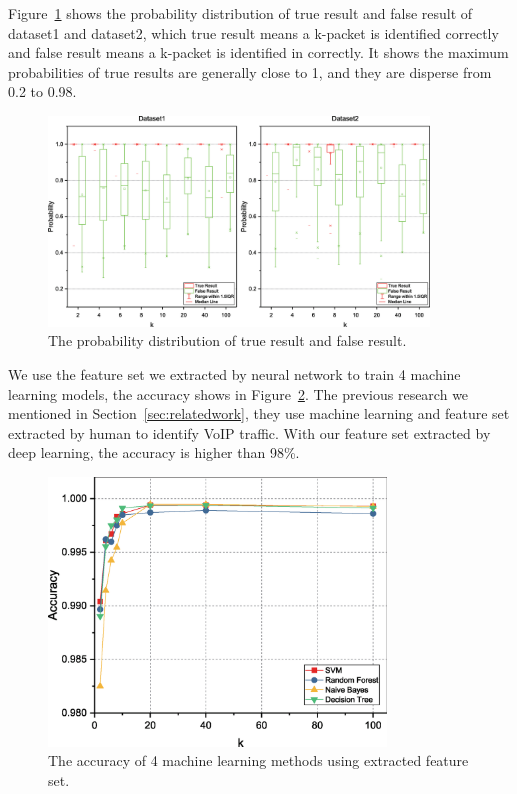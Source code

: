 \documentclass[conference]{IEEEtran}
\begin{document}
Figure~\ref{fig:tf} shows the probability distribution of true result and false result of dataset1 and dataset2, which true result means a k-packet is identified correctly and false result means a k-packet is identified in correctly. It shows the maximum probabilities of true results are generally close to 1, and they are disperse from 0.2 to 0.98.
\begin{figure}[htp]
\begin{center}
\includegraphics[width=0.9\textwidth]{tf.eps}
\caption{The probability distribution of true result and false result.}\label{fig:tf}
\end{center}
\end{figure}
We use the feature set we extracted by neural network to train 4 machine learning models, the accuracy shows in Figure~\ref{fig:ml}. The previous research we mentioned in Section~\ref{sec:relatedwork}, they use machine learning and feature set extracted by human to identify VoIP traffic. With our feature set extracted by deep learning, the accuracy is higher than 98\%.
\begin{figure}
  \centering
  \includegraphics[width=0.8\textwidth]{ml.eps}
  \caption{The accuracy of 4 machine learning methods using extracted feature set.}
  \label{fig:ml}
\end{figure}
\end{document}
